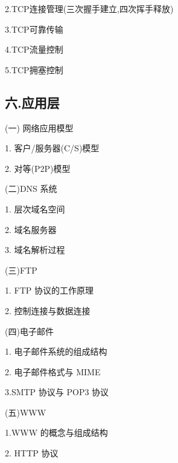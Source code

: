 \documentclass[10pt]{article}
\begin{document}
2.TCP连接管理(三次握手建立,四次挥手释放)

3.TCP可靠传输

4.TCP流量控制

5.TCP拥塞控制

\subsection*{六.应用层}

(一) 网络应用模型

1. 客户/服务器(C/S)模型

2. 对等(P2P)模型

(二)DNS 系统

1. 层次域名空间

2. 域名服务器

3. 域名解析过程

(三)FTP

1. FTP 协议的工作原理

2. 控制连接与数据连接

(四)电子邮件

1. 电子邮件系统的组成结构

2. 电子邮件格式与 MIME

3.SMTP 协议与 POP3 协议

(五)WWW

1.WWW 的概念与组成结构

2. HTTP 协议
\end{document}
